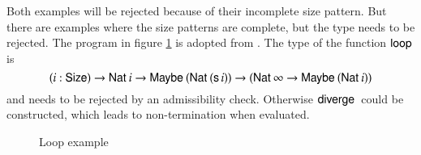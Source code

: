 Both examples will be rejected because of their incomplete size pattern.
But there are examples where the size patterns are complete, but the type needs to be rejected.
The program in figure \ref{loop} is adopted from \cite{abel:PhD}. The type of the function $\mathsf{loop}\:$ is   
\[( i : \mathsf{Size} ) \rightarrow{\mathsf{Nat}\:i \rightarrow\mathsf{Maybe}\:(\mathsf{Nat}\:(\mathsf{s}\,i)) \rightarrow(\mathsf{Nat}\:\infty \rightarrow\mathsf{Maybe}\:(\mathsf{Nat}\:i))} \]
and needs to be rejected by an admissibility check. Otherwise $\mathsf{diverge}\:$ could be constructed, which leads to non-termination
when evaluated.
\begin{figure}[p]
\caption{Loop example}
\label{loop}
\end{figure}


